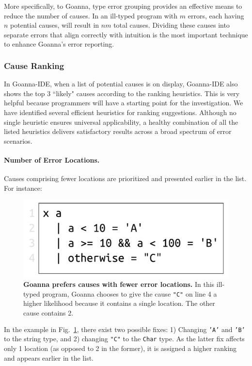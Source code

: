 	More specifically, to Goanna, type error grouping provides an effective means to reduce the number of causes. In an ill-typed program with $m$ errors, each having $n$ potential causes, will result in $nm$ total causes. Dividing these causes into separate errors that align correctly with intuition is the most important technique to enhance Goanna's error reporting.

    \subsubsection{Cause Ranking} \label{sub:ranking}
     In Goanna-IDE, when a list of potential causes is on display, Goanna-IDE also shows the top 3 ``likely" causes according to the ranking heuristics. This is very helpful because programmers will have a starting point for the investigation. We have identified several efficient heuristics for ranking suggestions. Although no single heuristic ensures universal applicability,  a healthy combination of all the listed heuristics delivers satisfactory results across a broad spectrum of error scenarios.

    \paragraph{Number of Error Locations.}
    Causes comprising fewer locations are prioritized and presented earlier in the list. For instance:
   \begin{figure}[ht!]
        \centering
        \includegraphics[width=0.5\linewidth]{images/Loc-Count}
        \caption[Goanna prefers causes with fewer error locations]{\textbf{Goanna prefers causes with fewer error locations.} In this ill-typed program, Goanna chooses to give the cause \texttt{"C"} on line 4 a higher likelihood because it contains a single location. The other cause contains 2. }
        \label{fig:loc-count}
    \end{figure}

    In the example in Fig.~\ref{fig:loc-count}, there exist two possible fixes: 1) Changing \texttt{'A'} and \texttt{'B'} to the string type, and 2) changing \texttt{"C"} to the \texttt{Char} type. As the latter fix affects only 1 location (as opposed to 2 in the former), it is assigned a higher ranking and appears earlier in the list.

